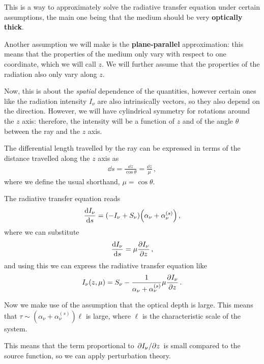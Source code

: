 \documentclass[main.tex]{subfiles}
\begin{document}
This is a way to approximately solve the radiative transfer equation under certain assumptions, the main one being that the medium should be very \textbf{optically thick}.

Another assumption we will make is the \textbf{plane-parallel} approximation: this means that the properties of the medium only vary with respect to one coordinate, which we will call \(z\). 
We will further assume that the properties of the radiation also only vary along \(z\). 

Now, this is about the \emph{spatial} dependence of the quantities, however certain ones like the radiation intensity \(I_\nu \) are also intrinsically vectors, so they also depend on the direction. 
However, we will have cylindrical symmetry for rotations around the \(z\) axis: therefore, the intensity will be a function of \(z\) and of the angle \(\theta \) between the ray and the \(z\) axis. 

The differential length travelled by the ray can be expressed in terms of the distance travelled along the \(z\) axis as
%
\begin{align}
\dd{s} = \frac{ \dd{z}}{\cos \theta } = \frac{ \dd{z}}{\mu }
\,,
\end{align}
%
where we define the usual shorthand, \(\mu  = \cos \theta \).

The radiative transfer equation reads 
%
\begin{align}
\dv{I_\nu }{s} = \qty(- I_\nu + S_\nu ) \qty(\alpha_{\nu } + \alpha_{\nu }^{(s)})
\,,
\end{align}
%
where we can substitute 
%
\begin{align}
\dv{I_\nu }{s} = \mu \pdv{I_\nu }{z}
\,,
\end{align}
%
and using this we can express the radiative transfer equation like 
%
\begin{align}
I_\nu (z, \mu ) = S_\nu - \frac{1}{\alpha_{\nu } + \alpha_{\nu }^{(s)}}
\mu \pdv{I_\nu }{z}
\,.
\end{align}

Now we make use of the assumption that the optical depth is large. This means that \(\tau \sim (\alpha_{\nu }+ \alpha_{\nu }^{(s)}) \ell\) is large, where \(\ell\) is the characteristic scale of the system. 


This means that the term proportional to \(\pdv*{I_\nu }{z}\) is small compared to the source function, so we can apply perturbation theory. 
\end{document}
